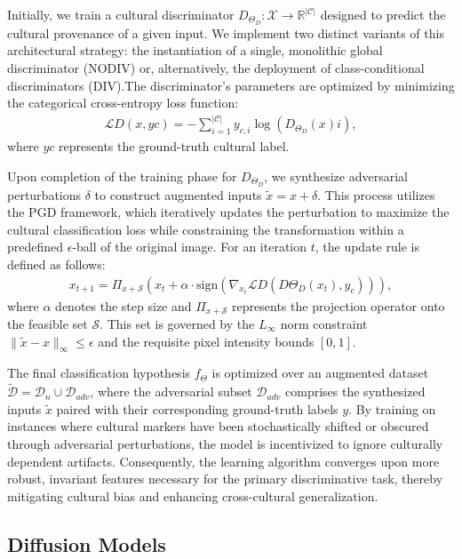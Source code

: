 Initially, we train a cultural discriminator $D_{\Theta_D}: \mathcal{X} \rightarrow \mathbb{R}^{|\mathcal{C}|}$ designed to predict the cultural provenance of a given input. 
We implement two distinct variants of this architectural strategy: the instantiation of a single, monolithic global discriminator (NODIV) or, alternatively, the deployment of class-conditional discriminators (DIV).The discriminator's parameters are optimized by minimizing the categorical cross-entropy loss function:\begin{align}\mathcal{L}D(x, y{c}) = - \sum_{i=1}^{|\mathcal{C}|} y_{c,i} \log(D_{\Theta_D}(x)i),
\end{align}
where $y{c}$ represents the ground-truth cultural label.

Upon completion of the training phase for $D_{\Theta_D}$, we synthesize adversarial perturbations $\delta$ to construct augmented inputs $\tilde{x} = x + \delta$. 
This process utilizes the PGD framework, which iteratively updates the perturbation to maximize the cultural classification loss while constraining the transformation within a predefined $\epsilon$-ball of the original image. For an iteration $t$, the update rule is defined as follows:
%
\begin{align}
x_{t+1} = \Pi_{x+\mathcal{S}} \left( x_t + \alpha \cdot \text{sign} \left( \nabla_{x_t} \mathcal{L}D(D{\Theta_D}(x_t), y_{c}) \right) \right),
\end{align}
%
where $\alpha$ denotes the step size and $\Pi_{x+\mathcal{S}}$ represents the projection operator onto the feasible set $\mathcal{S}$. 
This set is governed by the $L_\infty$ norm constraint $\| \tilde{x} - x \|_\infty \leq \epsilon$ and the requisite pixel intensity bounds $[0, 1]$.

The final classification hypothesis $f_{\Theta}$ is optimized over an augmented dataset $\tilde{\mathcal{D}} = \mathcal{D}_n \cup \mathcal{D}_{adv}$, where the adversarial subset $\mathcal{D}_{adv}$ comprises the synthesized inputs $\tilde{x}$ paired with their corresponding ground-truth labels $y$. 
By training on instances where cultural markers have been stochastically shifted or obscured through adversarial perturbations, the model is incentivized to ignore culturally dependent artifacts. Consequently, the learning algorithm converges upon more robust, invariant features necessary for the primary discriminative task, thereby mitigating cultural bias and enhancing cross-cultural generalization.

\subsection{Diffusion Models}
\label{ch2:sec:diff_model}

